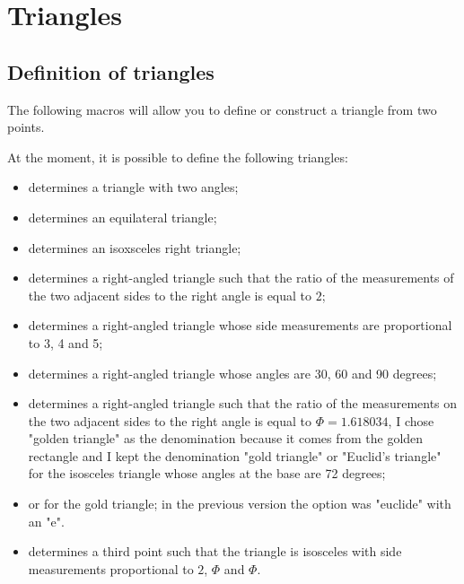 \section{Triangles}

\subsection{Definition of triangles }
The following macros will allow you to define or construct a triangle from  two points.

 At the moment, it is possible to define the following triangles:
 \begin{itemize}
\item  {}  determines a triangle with two angles;
\item  {}  determines an equilateral triangle;
\item  {}  determines an isoxsceles right triangle;
\item {} determines a right-angled triangle such that the ratio of the measurements of the two adjacent sides to the right angle is equal to $2$;
\item {} determines a right-angled triangle whose side measurements are proportional to 3, 4 and 5;
\item {} determines a right-angled triangle whose angles are 30, 60 and 90 degrees;
\item {} determines a right-angled triangle such that the ratio of the measurements on the two adjacent sides to the right angle is equal to $\Phi=1.618034$, I chose "golden triangle" as the denomination because it comes from the golden rectangle and I kept the denomination "gold triangle" or "Euclid's triangle" for the isosceles triangle whose angles at the base are 72 degrees;

\item  {} or  for the gold triangle; in the previous version the option was "euclide" with an "e".

\item {} determines a third point such that the triangle is isosceles with side measurements proportional to $2$, $\Phi$ and $\Phi$.
\end{itemize}

